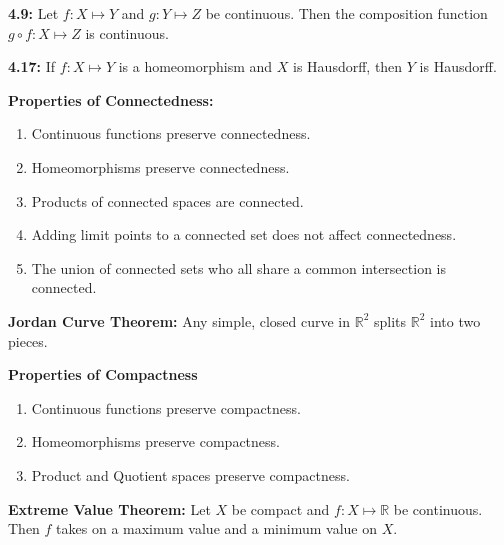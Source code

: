 \documentclass[letterpaper,12pt]{article}
\begin{document}
	\textbf{4.9:}
		Let $f:X\mapsto Y$ and $g:Y\mapsto Z$ be continuous. Then the composition function $g\circ f:X\mapsto Z$ is continuous.
	\newline{}

	\textbf{4.17:}
		If $f:X\mapsto Y$ is a homeomorphism and $X$ is Hausdorff, then $Y$ is Hausdorff.
	\newline{}

	\textbf{Properties of Connectedness:}
	\begin{enumerate}
		\item Continuous functions preserve connectedness.
		\item Homeomorphisms preserve connectedness.
		\item Products of connected spaces are connected.
		\item Adding limit points to a connected set does not affect connectedness.
		\item The union of connected sets who all share a common intersection is connected.
	\end{enumerate}

	\textbf{Jordan Curve Theorem:}
		Any simple, closed curve in $\mathbb{R}^{2}$ splits $\mathbb{R}^{2}$ into two pieces.
	\newline{}

	\textbf{Properties of Compactness}
	\begin{enumerate}
		\item Continuous functions preserve compactness.
		\item Homeomorphisms preserve compactness.
		\item Product and Quotient spaces preserve compactness.
	\end{enumerate}

	\textbf{Extreme Value Theorem:}
		Let $X$ be compact and $f:X\mapsto\mathbb{R}$ be continuous. Then $f$ takes on a maximum value and a minimum value on $X$.
\end{document}
